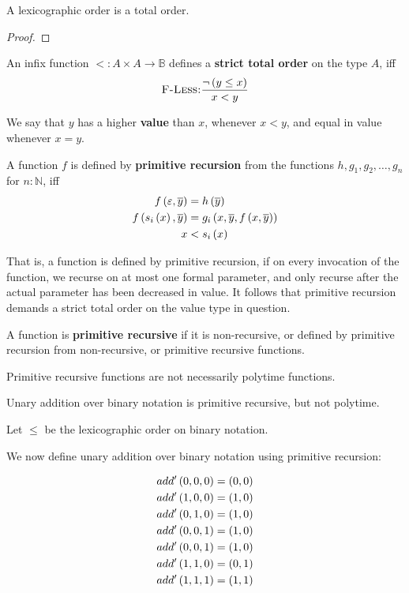 \begin{theorem} A lexicographic order is a total order. \end{theorem}

\begin{proof} \end{proof}

\begin{definition} An infix function $<:A\times A \rightarrow \mathbb{B}$
defines a \textbf{strict total order} on the type $A$, iff 
\begin{align}
\judgement[F-Less]{\neg \p{y \leq x}}{x < y}
\end{align}
\end{definition} 

We say that $y$ has a higher \textbf{value} than $x$, whenever $x<y$, and equal
in value whenever $x=y$.

\begin{definition} A function $f$ is defined by \textbf{primitive recursion}
from the functions $h,g_1,g_2,\ldots,g_n$ for $n:\mathbb{N}$, iff
\begin{align}
f\left({\varepsilon, \overline{y}}\right) &= h\left({\overline{y}}\right) \\
f\left({s_i\left({x}\right), \overline{y}}\right) &= g_i\left({x,\overline{y},f\left({x,\overline{y}}\right)}\right) \\
x &< s_i\left({x}\right)
\end{align}
\end{definition}

That is, a function is defined by primitive recursion, if on every invocation
of the function, we recurse on at most one formal parameter, and only recurse
after the actual parameter has been decreased in value. It follows that
primitive recursion demands a strict total order on the value type in question.

\begin{definition} A function is \textbf{primitive recursive} if it is
non-recursive, or defined by primitive recursion from non-recursive, or
primitive recursive functions.  \end{definition}

Primitive recursive functions are not necessarily polytime functions.

\begin{example}
Unary addition over binary notation is primitive recursive, but not polytime.

Let $\leq$ be the lexicographic order on binary notation.

We now define unary addition over binary notation using primitive recursion:

\begin{align}
add'\left({0,0,0}\right) = \left({0,0}\right) \\
add'\left({1,0,0}\right) = \left({1,0}\right) \\
add'\left({0,1,0}\right) = \left({1,0}\right) \\
add'\left({0,0,1}\right) = \left({1,0}\right) \\
add'\left({0,0,1}\right) = \left({1,0}\right) \\
add'\left({1,1,0}\right) = \left({0,1}\right) \\
add'\left({1,1,1}\right) = \left({1,1}\right)
\end{align}

\end{example}
